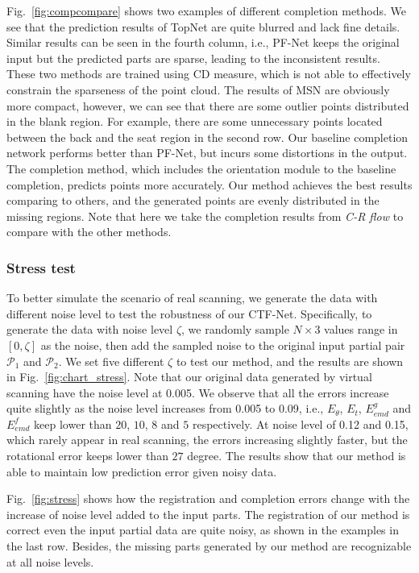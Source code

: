 Fig.~\ref{fig:compcompare} shows two examples of different completion methods. We see that the prediction results of TopNet are quite blurred and lack fine details. Similar results can be seen in the fourth column, i.e., PF-Net keeps the original input but the predicted parts are sparse, leading to the inconsistent results. These two methods are trained using CD measure, which is not able to effectively constrain the sparseness of the point cloud. The results of MSN are obviously more compact, however, we can see that there are some outlier points distributed in the blank region. For example, there are some unnecessary points  located between the back and the seat region in the second row. Our baseline completion network performs better than PF-Net, but incurs some distortions in the output. The completion method, which includes the orientation module to the baseline completion, predicts points more accurately. Our method achieves the best results comparing to others, and the generated points are evenly distributed in the missing regions. Note that here we take the completion results from \textit{C-R flow} to compare with the other methods.





\subsubsection{Stress test}
To better simulate the scenario of real scanning, we generate the data with different noise level to test the robustness of our CTF-Net. Specifically, to generate the data with noise level $\zeta$, we randomly sample $N \times 3$ values range in $[0, \zeta]$ as the noise, then add the sampled noise to the original input partial pair $\mathcal{P}_1$ and $\mathcal{P}_2$. We set five different $\zeta$ to test our method, and the results are shown in Fig.~\ref{fig:chart_stress}. Note that our original data generated by virtual scanning have the noise level at 0.005.
We observe that all the errors increase quite slightly as the noise level increases from 0.005 to 0.09, i.e., $E_\theta$, $E_t$, $E_{emd}^g$ and $E_{emd}^f$ keep lower than $20$, $10$, $8$ and $5$ respectively. 
At noise level of 0.12 and 0.15, which rarely appear in real scanning, the errors increasing slightly faster, but the rotational error keeps lower than $27$ degree. 
The results show that our method is able to maintain low prediction error given noisy data.

Fig.~\ref{fig:stress} shows how the registration and completion errors change with the increase of noise level added to the input parts.
The registration of our method is correct even the input partial data are quite noisy, as shown in the examples in the last row. Besides, the missing parts generated by our method are recognizable at all noise levels. 

